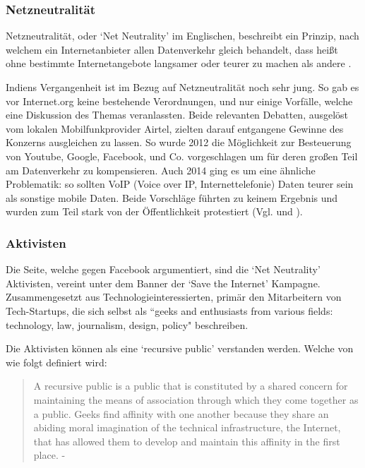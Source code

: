 \documentclass{article}
\begin{document}
\subsubsection{Netzneutralität} \label{netzneutralität}

Netzneutralität, oder `Net Neutrality' im Englischen, beschreibt ein Prinzip, nach welchem ein Internetanbieter allen Datenverkehr gleich behandelt, dass heißt ohne bestimmte Internetangebote langsamer oder teurer zu machen als andere \autocite{netzneutralität}.

\medskip

Indiens Vergangenheit ist im Bezug auf Netzneutralität noch sehr jung. So gab es vor Internet.org keine bestehende Verordnungen, und nur einige Vorfälle, welche eine Diskussion des Themas veranlassten.
Beide relevanten Debatten, ausgelöst vom lokalen Mobilfunkprovider Airtel, zielten darauf entgangene Gewinne des Konzerns ausgleichen zu lassen.
So wurde 2012 die Möglichkeit zur Besteuerung von Youtube, Google, Facebook, und Co. vorgeschlagen um für deren großen Teil am Datenverkehr zu kompensieren.
Auch 2014 ging es um eine ähnliche Problematik: so sollten VoIP (Voice over IP, Internettelefonie) Daten teurer sein als sonstige mobile Daten.
Beide Vorschläge führten zu keinem Ergebnis und wurden zum Teil stark von der Öffentlichkeit protestiert (Vgl. \textcite[253]{everydayLife} und \textcite{airtelVoip}).

\subsubsection{Aktivisten}

Die Seite, welche gegen Facebook argumentiert, sind die `Net Neutrality' Aktivisten, vereint unter dem Banner der `Save the Internet' Kampagne.
Zusammengesetzt aus Technologieinteressierten, primär den Mitarbeitern von Tech-Startups, die sich selbst als ``geeks and enthusiasts from various fields: technology, law, journalism, design, policy" \parencite{sti2015} beschreiben.

\medskip

Die Aktivisten können als eine `recursive public' verstanden werden. Welche von \textcite{twoBits} wie folgt definiert wird:

\medskip

\begin{quote}
A recursive public is a public that is constituted by a shared concern for maintaining the means of association through which they come together as a public.
Geeks find affinity with one another because they share an abiding moral imagination of the technical infrastructure, the Internet, that has allowed them to develop and maintain this affinity in the first place. - \cite[28]{twoBits}
\end{quote}
\end{document}
